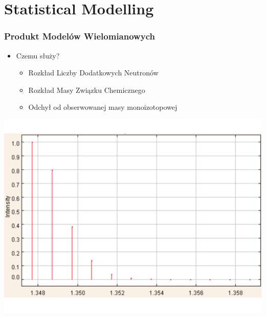 \documentclass[xetex]{beamer}
\begin{document}
\section[Model]{Statistical Modelling}
	\begin{frame}\frametitle{{\color{gray}Produkt} Model{\color{gray}ów} Wielomianowy{\color{gray}ch}}
		    
		\begin{itemize}
			\item Czemu służy?
			\begin{itemize}
				\item Rozkład Liczby Dodatkowych Neutronów
				\item Rozkład Masy Związku Chemicznego
				\item Odchył od obserwowanej masy monoizotopowej
			\end{itemize}
		\end{itemize}

		\begin{center}
			\includegraphics[height=.5\textheight, keepaspectratio]{./picts/realMassDistribution.pdf}
		\end{center}
	\end{frame}	
\end{document}

